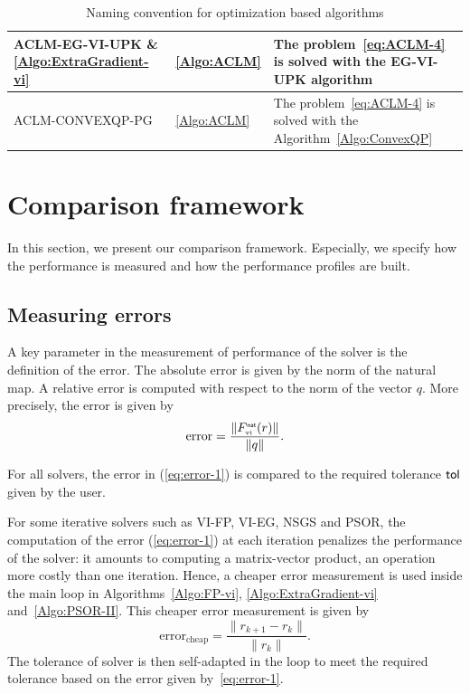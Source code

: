 \begin{table}
\begin{tabular}{|l|l|p{}|}
    \\
    \hline
    \sf ACLM-EG-VI-UPK \& \ref{Algo:ExtraGradient-vi}
    & \ref{Algo:ACLM}
    & The problem~\ref{eq:ACLM-4} is solved with the {\sf EG-VI-UPK} algorithm
    \\
    \hline
    \sf ACLM-CONVEXQP-PG
    &   \ref{Algo:ACLM}
    &  The problem~\ref{eq:ACLM-4} is solved with the Algorithm~\ref{Algo:ConvexQP}
    \\
    \hline
  \end{tabular}
  \caption{Naming convention for optimization based  algorithms}
  \label{tab:OPTI-algos}
\end{table}

\section{Comparison framework}
\label{sec:numericalcomparisons}
In this section, we present our comparison framework. Especially, we specify how the performance is measured and how the performance profiles are built.

\subsection{Measuring errors}
\label{Sec:MeasuringErrors}

A key parameter in the measurement of performance of the solver is the definition of the error. The absolute error is given by the  norm of the natural map. A relative error is computed with respect to the norm of the vector $q$. More precisely, the error is given by
\begin{equation}
  \label{eq:error-1}
  \mbox{error} = \frac{\|F^\nat_\vitwo(r)\|}{\|q\|}.
\end{equation}

For all solvers, the error in (\ref{eq:error-1}) is compared to the required tolerance $\sf tol$ given by the user. 


For some iterative solvers such as {\sf VI-FP}, {\sf VI-EG}, {\sf NSGS} and {\sf PSOR}, the computation of the error (\ref{eq:error-1})  at each iteration penalizes the performance of the solver:
it amounts to computing a matrix-vector product, an operation more costly than one iteration. Hence, a cheaper error measurement is used inside the main loop in Algorithms~\ref{Algo:FP-vi}, \ref{Algo:ExtraGradient-vi} and~\ref{Algo:PSOR-II}. This cheaper error measurement is given by
\begin{equation}
  \label{eq:error-2}
  \mbox{error}_{\mbox{cheap}} = \frac{\|r_{k+1}-r_{k}\|}{\|r_k\|}.
\end{equation}
The tolerance of solver is then self-adapted in the loop to meet the required tolerance based on the error given by~\eqref{eq:error-1}.


